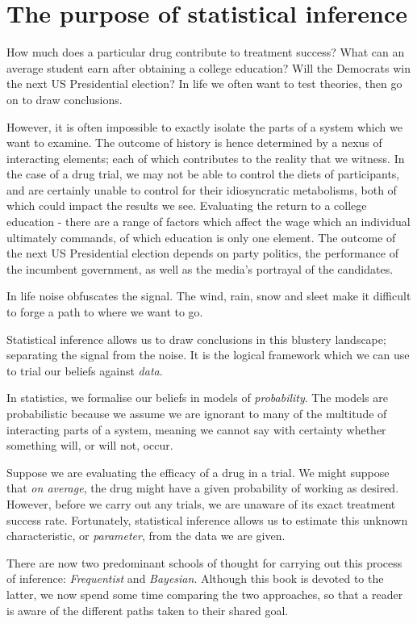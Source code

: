 \documentclass[11pt,fullpage]{book}
\begin{document}
\section{The purpose of statistical inference}\label{sec:Intro_purposeStatisticalInference}
How much does a particular drug contribute to treatment success? What can an average student earn after obtaining a college education? Will the Democrats win the next US Presidential election? In life we often want to test theories, then go on to draw conclusions.

However, it is often impossible to exactly isolate the parts of a system which we want to examine. The outcome of history is hence determined by a nexus of interacting elements; each of which contributes to the reality that we witness. In the case of a drug trial, we may not be able to control the diets of participants, and are certainly unable to control for their idiosyncratic metabolisms, both of which could impact the results we see. Evaluating the return to a college education - there are a range of factors which affect the wage which an individual ultimately commands, of which education is only one element. The outcome of the next US Presidential election depends on party politics, the performance of the incumbent government, as well as the media's portrayal of the candidates. 

In life noise obfuscates the signal. The wind, rain, snow and sleet make it difficult to forge a path to where we want to go.

Statistical inference allows us to draw conclusions in this blustery landscape; separating the signal from the noise. It is the logical framework which we can use to trial our beliefs against \textit{data}. 

In statistics, we formalise our beliefs in models of \textit{probability}. The models are probabilistic because we assume we are ignorant to many of the multitude of interacting parts of a system, meaning we cannot say with certainty whether something will, or will not, occur.

Suppose we are evaluating the efficacy of a drug in a trial. We might suppose that \textit{on average}, the drug might have a given probability of working as desired. However, before we carry out any trials, we are unaware of its exact treatment success rate. Fortunately, statistical inference allows us to estimate this unknown characteristic, or \textit{parameter}, from the data we are given. 

There are now two predominant schools of thought for carrying out this process of inference: \textit{Frequentist} and \textit{Bayesian}. Although this book is devoted to the latter, we now spend some time comparing the two approaches, so that a reader is aware of the different paths taken to their shared goal.
\end{document}
